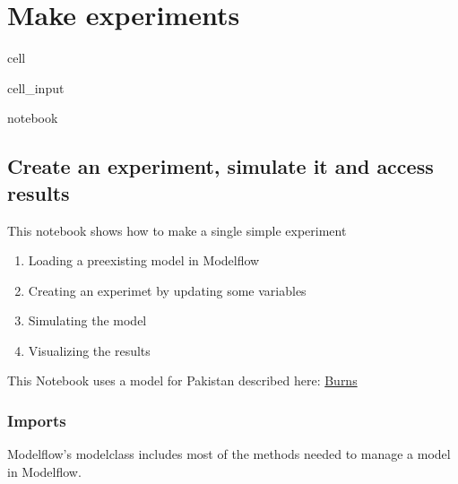 \documentclass[letterpaper,10pt,english]{jupyterBook}
\begin{document}
\part{Make experiments}

\sphinxstepscope

\begin{sphinxuseclass}{cell}\begin{sphinxVerbatimInput}

\begin{sphinxuseclass}{cell_input}
\begin{sphinxVerbatim}[commandchars=\\\{\}]
 notebook
\end{sphinxVerbatim}

\end{sphinxuseclass}\end{sphinxVerbatimInput}

\end{sphinxuseclass}

\chapter{Create an experiment, simulate it and access results}
\label{\detokenize{content/howto/experiments/create_experiment:create-an-experiment-simulate-it-and-access-results}}\label{\detokenize{content/howto/experiments/create_experiment::doc}}
\sphinxAtStartPar
This notebook shows how to make a single simple experiment
\begin{enumerate}
%
\item {} 
\sphinxAtStartPar
Loading a pre\sphinxhyphen{}existing model in Modelflow

\item {} 
\sphinxAtStartPar
Creating an experimet by updating some variables

\item {} 
\sphinxAtStartPar
Simulating the model

\item {} 
\sphinxAtStartPar
Visualizing the results

\end{enumerate}

\sphinxAtStartPar
This Notebook uses a  model for Pakistan described here: \hyperlink{cite.content/litterature:id14}{Burns }


\section{Imports}
\label{\detokenize{content/howto/experiments/create_experiment:imports}}
\sphinxAtStartPar
Modelflow’s modelclass includes most of the methods needed to manage a model in Modelflow.
\end{document}
